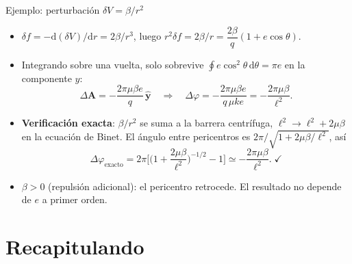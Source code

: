 \documentclass[aspectratio=169]{beamer}
\newcommand{\dd}{\mathrm{d}}
\newcommand{\vA}{\mathbf A}
\begin{document}
\begin{frame}{Ejemplo: perturbación $\delta V=\beta/r^{2}$}
\small
\begin{itemize}
  \item<1-> $\delta f=-\dd(\delta V)/\dd r=2\beta/r^{3}$, luego
        $r^{2}\delta f=2\beta/r=\dfrac{2\beta}{q}(1+e\cos\theta)$.
  \item<2-> Integrando sobre una vuelta, solo sobrevive
        $\oint e\cos^{2}\theta\,\dd\theta=\pi e$ en la componente $y$:
  \[
    \Delta\vA=-\frac{2\pi\mu\beta e}{q}\,\hat{\mathbf y}
    \quad\Longrightarrow\quad
    \Delta\varphi=-\frac{2\pi\mu\beta e}{q\,\mu k e}=-\frac{2\pi\mu\beta}{\ell^{2}} .
  \]
  \item<3-> \textbf{Verificación exacta}: $\beta/r^{2}$ se suma a la barrera centrífuga,
        $\ell^{2}\to\ell^{2}+2\mu\beta$ en la ecuación de Binet. El ángulo entre pericentros es
        $2\pi/\sqrt{1+2\mu\beta/\ell^{2}}$, así
  \[
    \Delta\varphi_{\text{exacto}}=2\pi\Big[\Big(1+\frac{2\mu\beta}{\ell^{2}}\Big)^{-1/2}-1\Big]
    \simeq-\frac{2\pi\mu\beta}{\ell^{2}} .\;\checkmark
  \]
  \item<4-> $\beta>0$ (repulsión adicional): el pericentro retrocede. El resultado no depende
        de $e$ a primer orden.
\end{itemize}
\end{frame}

\section[Recapitulando]{Recapitulando}
\end{document}
